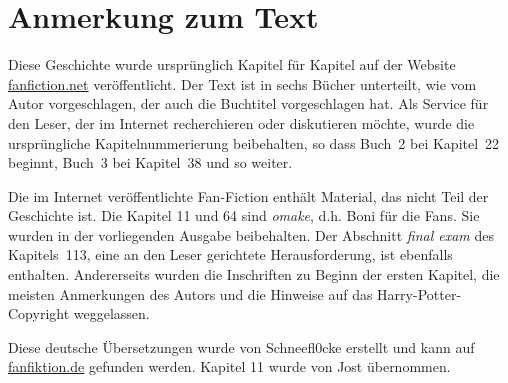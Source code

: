 \chapter{Anmerkung zum Text}
Diese Geschichte wurde ursprünglich Kapitel für Kapitel auf der Website
\href{https://www.fanfiction.net/s/5782108/1/Harry-Potter-and-the-Methods-of-Rationality}{\UrlFont
fanfiction.net} veröffentlicht. Der Text ist in sechs Bücher unterteilt, wie vom
Autor vorgeschlagen, der auch die Buchtitel vorgeschlagen hat. Als Service
für den Leser, der im Internet recherchieren oder diskutieren möchte, wurde die
ursprüngliche Kapitelnummerierung beibehalten, so dass Buch~2 bei Kapitel~22
beginnt, Buch~3 bei Kapitel~38 und so weiter.

Die im Internet veröffentlichte Fan-Fiction enthält Material, das nicht Teil der
Geschichte ist. Die Kapitel 11 und 64 sind \emph{omake}, d.h. Boni für die Fans.
Sie wurden in der vorliegenden Ausgabe beibehalten. Der Abschnitt \emph{final
exam} des Kapitels~113, eine an den Leser gerichtete Herausforderung, ist
ebenfalls enthalten. Andererseits wurden die Inschriften zu Beginn der ersten
Kapitel, die meisten Anmerkungen des Autors und die Hinweise auf das
Harry-Potter-Copyright weggelassen.

Diese deutsche Übersetzungen wurde von Schneefl0cke erstellt und kann auf
\href{https://www.fanfiktion.de/s/60044849000ccc541aef297e/1/Ubersetzung-Harry-Potter-und-die-Methoden-des-rationalen-Denkens-Harry-Potter-and-the-methods-of-rationality}{\UrlFont
fanfiktion.de} gefunden werden. Kapitel 11 wurde von Jost übernommen.